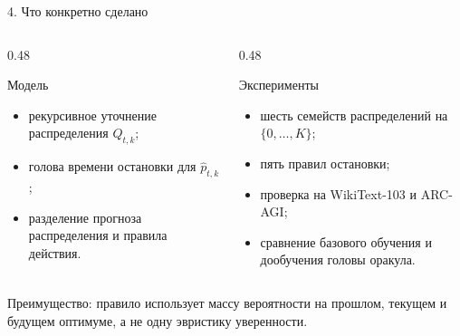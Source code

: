 \documentclass[aspectratio=169,11pt]{beamer}
\newcommand{\smallnote}[1]{{\color{mutedText}\small #1}}
\begin{document}
\begin{frame}{4. Что конкретно сделано}
\begin{columns}[T,onlytextwidth]
\begin{column}{0.48\textwidth}
\begin{block}{Модель}
\begin{itemize}\setlength\itemsep{1.5mm}
\item рекурсивное уточнение распределения $Q_{t,k}$;
\item голова времени остановки для $\widehat p_{t,k}$;
\item разделение прогноза распределения и правила действия.
\end{itemize}
\end{block}
\end{column}
\begin{column}{0.48\textwidth}
\begin{block}{Эксперименты}
\begin{itemize}\setlength\itemsep{1.5mm}
\item шесть семейств распределений на $\{0,\ldots,K\}$;
\item пять правил остановки;
\item проверка на WikiText-103 и ARC-AGI;
\item сравнение базового обучения и дообучения головы оракула.
\end{itemize}
\end{block}
\end{column}
\end{columns}

\vspace{3mm}
\smallnote{Преимущество: правило использует массу вероятности на прошлом, текущем и будущем оптимуме, а не одну эвристику уверенности.}
\end{frame}
\end{document}
